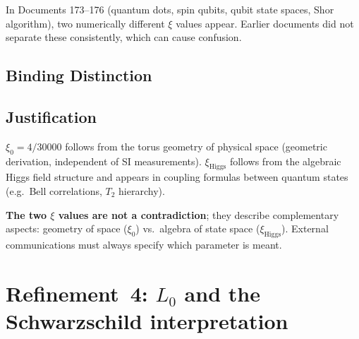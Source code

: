 In Documents 173--176 (quantum dots, spin qubits, qubit state spaces,
Shor algorithm), two numerically different $\xi$ values appear.
Earlier documents did not separate these consistently, which can
cause confusion.

\subsection*{Binding Distinction}

\begin{center}
{\footnotesize
{}
}
\end{center}

\subsection*{Justification}

$\xi_0 = 4/30000$ follows from the torus geometry of physical space
(geometric derivation, independent of SI measurements).
$\xi_{\text{Higgs}}$ follows from the algebraic Higgs field structure
and appears in coupling formulas between quantum states (e.g.\ Bell
correlations, $T_2$ hierarchy).

\textbf{The two $\xi$ values are not a contradiction}; they describe
complementary aspects: geometry of space ($\xi_0$) vs.\ algebra of
state space ($\xi_{\text{Higgs}}$). External communications must always
specify which parameter is meant.

\section{\texorpdfstring{Refinement~4: $L_0$ and the Schwarzschild interpretation}{Refinement 4: L0 and the Schwarzschild interpretation}}

